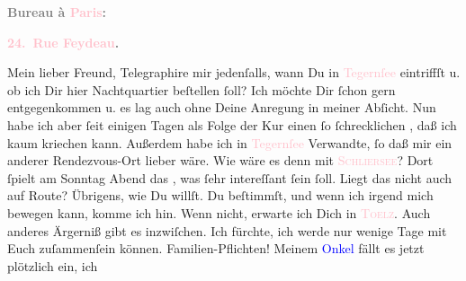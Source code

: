            \pstart
           \begin{otherlanguage}{french}\textcolor{gray}{\textbf{\textbf{Bureau à \textcolor{pink}{Paris}{}\ledrightnote{\textcolor{pink}{Paris}}:}}}\end{otherlanguage}\pend
           \pstart
           \begin{otherlanguage}{french}\textcolor{gray}{\textbf{\textbf{\textcolor{pink}{24. Rue Feydeau}{}\ledrightnote{\textcolor{pink}{rue Feydeau}}.}}}\end{otherlanguage}\pend
           \pstart\center{}Mein lieber Freund,\pend\pstart
           Telegraphire mir jedenſalls, \strikeout{\textcolor{gray}{×}} wann Du in \textcolor{pink}{Tegernſee}{}\ledrightnote{\textcolor{pink}{Tegernsee}} eintriffſt u. ob
               ich Dir hier Nachtquartier beſtellen ſoll? Ich möchte Dir ſchon gern entgegenkommen
               u. es lag auch ohne Deine Anregung in meiner Abſicht. Nun habe ich aber ſeit einigen
               Tagen als Folge der Kur einen ſo ſchrecklichen \label{K_L02746-1v}\label{K_L02746-1h}, daß ich kaum kriechen kann. Außerdem habe
               ich in \textcolor{pink}{Tegernſee}{}\ledrightnote{\textcolor{pink}{Tegernsee}} Verwandte, ſo daß mir ein
               anderer Rendezvous-Ort lieber wäre. Wie wäre es denn mit \textsc{\textcolor{pink}{Schliersee}{}\ledrightnote{\textcolor{pink}{Schliersee}}}? Dort {\pb}ſpielt am Sonntag{ }Abend das \label{K_L02746-55v}\label{K_L02746-55h}, was ſehr
               intereſſant ſein ſoll. Liegt das nicht auch auf \label{K_L02746-88v}\label{K_L02746-88h} Route?\pend
           \pstart
           Übrigens, wie Du willſt. Du beſtimmſt, und wenn ich irgend mich bewegen kann, komme
               ich hin. Wenn nicht, erwarte ich Dich in \textsc{\textcolor{pink}{Toelz}{}\ledrightnote{\textcolor{pink}{Bad Tölz}}}.\pend
           \pstart
           Auch anderes Ärgerniß gibt es inzwiſchen. Ich fürchte, ich werde nur wenige Tage mit
               Euch zuſammenſein können. Familien-Pflichten! Meinem \textcolor{blue}{Onkel}{} fällt es jetzt plötzlich ein, ich
